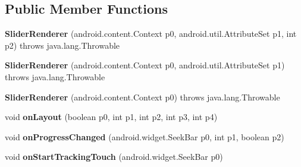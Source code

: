 \subsection*{Public Member Functions}
\begin{DoxyCompactItemize}
\item 
\mbox{\label{classmd5b60ffeb829f638581ab2bb9b1a7f4f3f_1_1SliderRenderer_ac4a155c9357e2f48baece33e8590b462}} 
{\bfseries Slider\+Renderer} (android.\+content.\+Context p0, android.\+util.\+Attribute\+Set p1, int p2)  throws java.\+lang.\+Throwable 	
\item 
\mbox{\label{classmd5b60ffeb829f638581ab2bb9b1a7f4f3f_1_1SliderRenderer_aa6d32149e1dbf9076af62a46ae72331f}} 
{\bfseries Slider\+Renderer} (android.\+content.\+Context p0, android.\+util.\+Attribute\+Set p1)  throws java.\+lang.\+Throwable 	
\item 
\mbox{\label{classmd5b60ffeb829f638581ab2bb9b1a7f4f3f_1_1SliderRenderer_afe6177683ec0ebd537f6aa0d703bf526}} 
{\bfseries Slider\+Renderer} (android.\+content.\+Context p0)  throws java.\+lang.\+Throwable 	
\item 
\mbox{\label{classmd5b60ffeb829f638581ab2bb9b1a7f4f3f_1_1SliderRenderer_afac38e4eaa408c22962aa4a88025b986}} 
void {\bfseries on\+Layout} (boolean p0, int p1, int p2, int p3, int p4)
\item 
\mbox{\label{classmd5b60ffeb829f638581ab2bb9b1a7f4f3f_1_1SliderRenderer_a8749343787854a49aedab1eb23f1b5fd}} 
void {\bfseries on\+Progress\+Changed} (android.\+widget.\+Seek\+Bar p0, int p1, boolean p2)
\item 
\mbox{\label{classmd5b60ffeb829f638581ab2bb9b1a7f4f3f_1_1SliderRenderer_a94e46916cabbb945547dd03b6915531b}} 
void {\bfseries on\+Start\+Tracking\+Touch} (android.\+widget.\+Seek\+Bar p0)
\item 
\mbox{\label{classmd5b60ffeb829f638581ab2bb9b1a7f4f3f_1_1SliderRenderer_a7311d722d790861ea5026d332a612245}} 

\end{DoxyCompactItemize}
